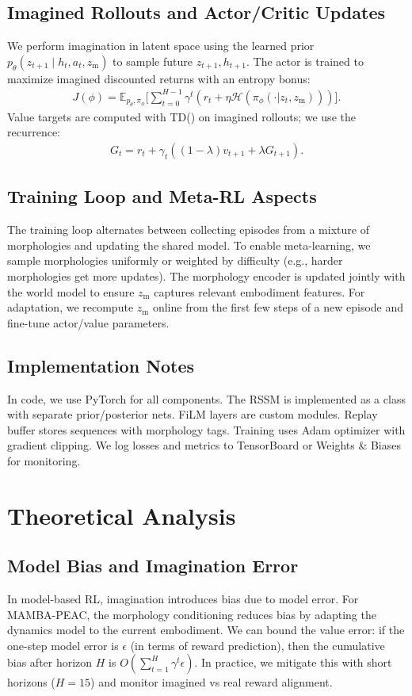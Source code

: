\documentclass{article}
\begin{document}
\subsection{Imagined Rollouts and Actor/Critic Updates}
We perform imagination in latent space using the learned prior $p_\theta(z_{t+1}\mid h_t,a_t,z_{\mathrm{m}})$ to sample future $z_{t+1},h_{t+1}$. The actor is trained to maximize imagined discounted returns with an entropy bonus:
\begin{align}
J(\phi) = \mathbb{E}_{p_\theta,\pi_\phi}\Big[\sum_{t=0}^{H-1} \gamma^t (r_t + \eta\mathcal{H}(\pi_\phi(\cdot|z_t,z_{\mathrm{m}})))\Big].
\end{align}
Value targets are computed with TD(\lambda) on imagined rollouts; we use the recurrence:
\begin{align}
G_t = r_t + \gamma_t((1-\lambda)v_{t+1} + \lambda G_{t+1}).
\end{align}

\subsection{Training Loop and Meta-RL Aspects}
The training loop alternates between collecting episodes from a mixture of morphologies and updating the shared model. To enable meta-learning, we sample morphologies uniformly or weighted by difficulty (e.g., harder morphologies get more updates). The morphology encoder is updated jointly with the world model to ensure $z_{\mathrm{m}}$ captures relevant embodiment features. For adaptation, we recompute $z_{\mathrm{m}}$ online from the first few steps of a new episode and fine-tune actor/value parameters.

\subsection{Implementation Notes}
In code, we use PyTorch for all components. The RSSM is implemented as a class with separate prior/posterior nets. FiLM layers are custom modules. Replay buffer stores sequences with morphology tags. Training uses Adam optimizer with gradient clipping. We log losses and metrics to TensorBoard or Weights \& Biases for monitoring.

\section{Theoretical Analysis}
\subsection{Model Bias and Imagination Error}
In model-based RL, imagination introduces bias due to model error. For MAMBA-PEAC, the morphology conditioning reduces bias by adapting the dynamics model to the current embodiment. We can bound the value error: if the one-step model error is $\epsilon$ (in terms of reward prediction), then the cumulative bias after horizon $H$ is $O(\sum_{t=1}^H \gamma^t \epsilon)$. In practice, we mitigate this with short horizons ($H=15$) and monitor imagined vs real reward alignment.
\end{document}
